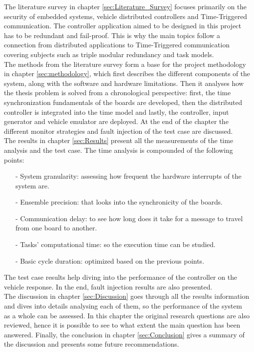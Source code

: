 \documentclass[table,xcdraw]{article}
\begin{document}
The literature survey in chapter \ref{sec:Literature_Survey} focuses primarily on the security of embedded systems, vehicle distributed controllers and Time-Triggered communication. The controller application aimed to be designed in this project has to be redundant and fail-proof. This is why the main topics follow a connection from distributed applications to Time-Triggered communication covering subjects such as triple modular redundancy and task models.\\

The methods from the literature survey form a base for the project methodology in chapter \ref{sec:methodology}, which first describes the different components of the system, along with the software and hardware limitations. Then it analyses how the thesis problem is solved from a chronological perspective: first, the time synchronization fundamentals of the boards are developed, then the distributed controller is integrated into the time model and lastly, the controller, input generator and vehicle emulator are deployed. At the end of the chapter the different monitor strategies and fault injection of the test case are discussed.\\

The results in chapter \ref{sec:Results} present all the measurements of the time analysis and the test case. The time analysis is compounded of the following points:
\begin{itemize}
    \item[-] System granularity: assessing how frequent the hardware interrupts of the system are.
    \item[-] Ensemble precision: that looks into the synchronicity of the boards.
    \item[-] Communication delay: to see how long does it take for a message to travel from one board to another.
    \item[-] Tasks' computational time: so the execution time can be studied.
    \item[-] Basic cycle duration: optimized based on the previous points.
\end{itemize}
The test case results help diving into the performance of the controller on the vehicle response. In the end, fault injection results are also presented.\\

The discussion in chapter \ref{sec:Discussion} goes through all the results information and dives into details analysing each of them, so the performance of the system as a whole can be assessed. In this chapter the original research questions are also reviewed, hence it is possible to see to what extent the main question has been answered. Finally, the conclusion in chapter \ref{sec:Conclusion} gives a summary of the discussion and presents some future recommendations. 
\end{document}
